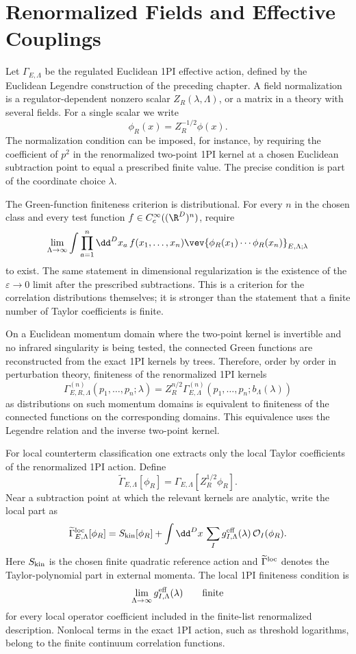 \section{Renormalized Fields and Effective Couplings}

Let \(\Gamma_{E,\Lambda}\) be the regulated Euclidean 1PI effective action,
defined by the Euclidean Legendre construction of the preceding chapter.  A
field normalization is a regulator-dependent nonzero scalar \(Z_R(\lambda,
\Lambda)\), or a matrix in a theory with several fields.  For a single scalar
we write
\[
  \phi_R(x)=Z_R^{-1/2}\phi(x).
\]
The normalization condition can be imposed, for instance, by requiring the
coefficient of \(p^2\) in the renormalized two-point 1PI kernel at a chosen
Euclidean subtraction point to equal a prescribed finite value.  The precise
condition is part of the coordinate choice \(\lambda\).

The Green-function finiteness criterion is distributional.  For every \(n\)
in the chosen class and every test function
\(f\in C_c^\infty((\R^D)^n)\), require
\[
  \lim_{\Lambda\to\infty}
  \int\prod_{a=1}^n\dd^Dx_a\,
  f(x_1,\ldots,x_n)
  \vev{\phi_R(x_1)\cdots\phi_R(x_n)}_{E,\Lambda;\lambda}
\]
to exist.  The same statement in dimensional regularization is the existence
of the \(\varepsilon\to0\) limit after the prescribed subtractions.  This is a
criterion for the correlation distributions themselves; it is stronger than
the statement that a finite number of Taylor coefficients is finite.

On a Euclidean momentum domain where the two-point kernel is invertible and no
infrared singularity is being tested, the connected Green functions are
reconstructed from the exact 1PI kernels by trees.  Therefore, order by order
in perturbation theory, finiteness of the renormalized 1PI kernels
\[
  \Gamma^{(n)}_{E,R,\Lambda}(p_1,\ldots,p_n;\lambda)
  =
  Z_R^{n/2}
  \Gamma^{(n)}_{E,\Lambda}(p_1,\ldots,p_n;b_\Lambda(\lambda))
\]
as distributions on such momentum domains is equivalent to finiteness of the
connected functions on the corresponding domains.  This equivalence uses the
Legendre relation and the inverse two-point kernel.

For local counterterm classification one extracts only the local Taylor
coefficients of the renormalized 1PI action.  Define
\[
  \widetilde\Gamma_{E,\Lambda}[\phi_R]
  =
  \Gamma_{E,\Lambda}[Z_R^{1/2}\phi_R].
\]
Near a subtraction point at which the relevant kernels are analytic, write the
local part as
\[
  \widetilde\Gamma_{E,\Lambda}^{\rm loc}[\phi_R]
  =
  S_{\rm kin}[\phi_R]
  +
  \int \dd^Dx\,
  \sum_I g^{\rm eff}_{I,\Lambda}(\lambda)\,
  \mathcal O_I(\phi_R).
\]
Here \(S_{\rm kin}\) is the chosen finite quadratic reference action and
\(\widetilde\Gamma^{\rm loc}\) denotes the Taylor-polynomial part in external
momenta.  The local 1PI finiteness condition is
\[
  \lim_{\Lambda\to\infty}
  g^{\rm eff}_{I,\Lambda}(\lambda)
  \qquad
  \hbox{finite}
\]
for every local operator coefficient included in the finite-list
renormalized description.  Nonlocal terms in the exact 1PI action, such as
threshold logarithms, belong to the finite continuum correlation functions.

